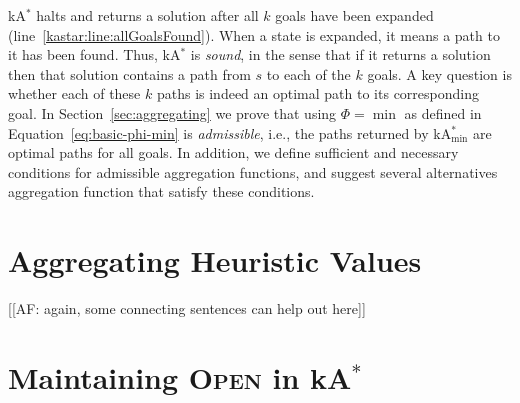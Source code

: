 \documentclass[twoside,11pt]{article}
\newcommand{\kastar}{kA$^*$\xspace}
\newcommand{\kastarvar}[1]{\textup{kA}$^*_{#1}$\xspace}
\newcommand{\kastarmin}{\kastarvar{\min}}
\newcommand{\open}{\textsc{Open}\xspace}
\newcommand{\roni}[1]{\textbf{[RS:#1]}}
\begin{document}
\kastar halts and returns a solution after all $k$ goals have been expanded (line~\ref{kastar:line:allGoalsFound}).
When a state is expanded, it means a path to it has been found.
Thus, \kastar is \emph{sound}, in the sense that if it returns a solution then that solution contains a path from $s$ to each of the $k$ goals.
A key question is whether each of these $k$ paths is indeed an optimal path to its corresponding goal. 
In Section~\ref{sec:aggregating} we prove that 
using $\Phi=\min$ as defined in Equation~\ref{eq:basic-phi-min} is \emph{admissible}, i.e., the paths returned by \kastarmin are optimal paths for all goals. In addition, we define sufficient and necessary conditions for admissible aggregation functions, and suggest several alternatives aggregation function that satisfy these conditions. 




\section{Aggregating Heuristic Values}

[[AF: again, some connecting sentences can help out here]]




\section{Maintaining \open in \kastar}
\label{sec:lazy}




\end{document}

